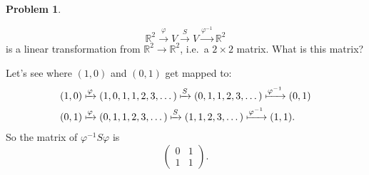 \documentclass[11pt,oneside]{amsart}
\theoremstyle{definition}
\newtheorem{problem}{Problem}
\newcommand{\bR}{\mathbb{R}}
\begin{document}
\begin{problem}
\begin{enumerate}[(a)]
            \[\bR^2\xrightarrow{\varphi}V\xrightarrow S V\xrightarrow{\varphi^{-1}}\bR^2\]
            is a linear transformation from $\bR^2\to\bR^2$, i.e.\ a $2\times 2$ matrix. What is this matrix?
            \begin{solution}
                Let's see where $(1,0)$ and $(0,1)$ get mapped to:
                \begin{align*}
                    (1,0) &\xmapsto \varphi (1,0,1,1,2,3,\dots)\xmapsto S (0,1,1,2,3,\dots)\xmapsto{\varphi^{-1}} (0,1) \\
                    (0,1) &\xmapsto\varphi (0,1,1,2,3,\dots) \xmapsto S (1,1,2,3,\dots)\xmapsto{\varphi^{-1}} (1,1).
                \end{align*}
                So the matrix of $\varphi^{-1}S\varphi$ is
                \[\begin{pmatrix}
                    0&1\\
                    1&1
                \end{pmatrix}.\]
            \end{solution}
        \end{enumerate}
    \end{problem}
\end{document}
